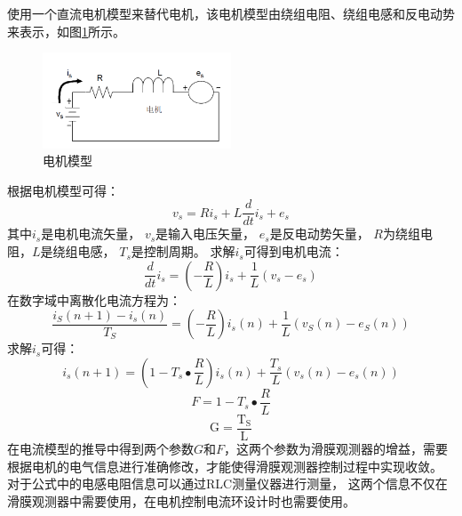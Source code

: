 ﻿\documentclass[12pt,a4paper]{article}
\begin{document}
使用一个直流电机模型来替代电机，该电机模型由绕组电阻、绕组电感和反电动势来表示，如图\ref{Con3}所示。
\begin{figure}
  \centering
  \includegraphics[width=0.5\textwidth]{./picture/电机模型.png}
  \caption{电机模型}
  \label{Con3}
\end{figure}
根据电机模型可得：
\begin{equation}
  v_{s}=R i_{s}+L \frac{d}{d t} i_{s}+e_{s}
\end{equation}
其中$i_{s}$是电机电流矢量，
$v_{s}$是输入电压矢量，
$e_{s}$是反电动势矢量，
$R$为绕组电阻，$L$是绕组电感，
$T_s$是控制周期。
求解$i_s$可得到电机电流：
\begin{equation}
  \frac{d}{d t} i_{s}=\left(-\frac{R}{L}\right) i_{s}+\frac{1}{L}\left(v_{s}-e_{s}\right)
\end{equation}
在数字域中离散化电流方程为：
\begin{equation}
  \frac{i_{S}(n+1)-i_{s}(n)}{T_{S}}=\left(-\frac{R}{L}\right) i_{s}(n)+\frac{1}{L}\left(v_{S}(n)-e_{S}(n)\right)
\end{equation}
求解$i_s$可得：
\begin{equation}
  i_{s}(n+1)=\left(1-T_{s} \bullet \frac{R}{L}\right) i_{s}(n)+\frac{T_{s}}{L}\left(v_{s}(n)-e_{s}(n)\right)
\end{equation}
\begin{equation}
  F=1-T_{s} \bullet \frac{R}{L}
\end{equation}
\begin{equation}
  \mathrm{G}=\frac{\mathrm{T}_{\mathrm{S}}}{\mathrm{L}}
\end{equation}
在电流模型的推导中得到两个参数$G$和$F$，这两个参数为滑膜观测器的增益，需要根据电机的电气信息进行准确修改，才能使得滑膜观测器控制过程中实现收敛。
对于公式中的电感电阻信息可以通过RLC测量仪器进行测量，
这两个信息不仅在滑膜观测器中需要使用，在电机控制电流环设计时也需要使用。
\end{document}
